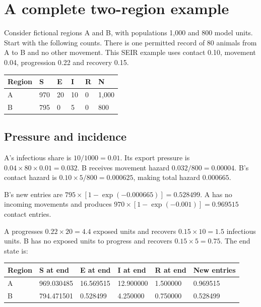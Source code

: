 \documentclass[11pt,a4paper]{article}
\begin{document}
\section{A complete two-region
example}\label{a-complete-two-region-example}

Consider fictional regions A and B, with populations 1,000 and 800 model
units. Start with the following counts. There is one permitted record of
80 animals from A to B and no other movement. This SEIR example uses
contact 0.10, movement 0.04, progression 0.22 and recovery 0.15.

\begin{longtable}[]{@{}llllll@{}}
\toprule\noalign{}
Region & S & E & I & R & N \\
\midrule\noalign{}
\endhead
\bottomrule\noalign{}
\endlastfoot
A & 970 & 20 & 10 & 0 & 1,000 \\
B & 795 & 0 & 5 & 0 & 800 \\
\end{longtable}

\subsection{Pressure and incidence}\label{pressure-and-incidence}

A's infectious share is \(10/1000 = 0.01\). Its export pressure is
\(0.04 \times  80 \times  0.01 = 0.032\). B receives movement hazard
\(0.032/800 = 0.00004\). B's contact hazard is
\(0.10 \times  5/800 = 0.000625\), making total hazard \(0.000665\).

B's new entries are \(795 \times  [1-\exp(-0.000665)] = 0.528499\). A
has no incoming movements and produces
\(970 \times  [1-\exp(-0.001)] = 0.969515\) contact entries.

A progresses \(0.22 \times  20 = 4.4\) exposed units and recovers
\(0.15 \times  10 = 1.5\) infectious units. B has no exposed units to
progress and recovers \(0.15 \times  5 = 0.75\). The end state is:

\begin{longtable}[]{@{}llllll@{}}
\toprule\noalign{}
Region & S at end & E at end & I at end & R at end & New entries \\
\midrule\noalign{}
\endhead
\bottomrule\noalign{}
\endlastfoot
A & 969.030485 & 16.569515 & 12.900000 & 1.500000 & 0.969515 \\
B & 794.471501 & 0.528499 & 4.250000 & 0.750000 & 0.528499 \\
\end{longtable}
\end{document}
